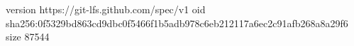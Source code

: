 version https://git-lfs.github.com/spec/v1
oid sha256:0f5329bd863cd9dbc0f5466f1b5adb978c6eb212117a6ec2c91afb268a8a29f6
size 87544
